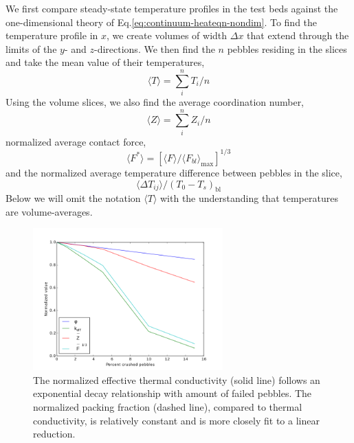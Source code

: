 We first compare steady-state temperature profiles in the test beds against the one-dimensional theory of Eq.\ref{eq:continuum-heateqn-nondim}. To find the temperature profile in $x$, we create volumes of width $\Delta x$ that extend through the limits of the $y$- and $z$-directions. We then find the $n$ pebbles residing in the slices and take the mean value of their temperatures, 
\begin{equation}
	\langle T\rangle = \sum_{i}^n T_i / n	
\end{equation}
Using the volume slices, we also find the average coordination number, 
\begin{equation}
	\langle Z \rangle = \sum_{i}^n Z_i / n
\end{equation}
normalized average contact force, 
\begin{equation}
	\langle F^* \rangle=\left[\langle F \rangle/\langle F_{bl} \rangle_\text{max}\right]^{1/3}
\end{equation}
and the normalized average temperature difference between pebbles in the slice,
\begin{equation}
	 \langle \Delta T_{ij} \rangle / (T_0 - T_s)_\text{bl}
\end{equation}
Below we will omit the notation $\langle T \rangle$ with the understanding that temperatures are volume-averages. 


\begin{figure}[htbp]
	\centering
	\includegraphics[width=0.65\textwidth]{chapters/figures/kEff_packingFraction}
	\caption{The normalized effective thermal conductivity (solid line) follows an exponential decay relationship with amount of failed pebbles. The normalized packing fraction (dashed line), compared to thermal conductivity, is relatively constant and is more closely fit to a linear reduction.}
\label{fig:packingFraction}
\end{figure}

